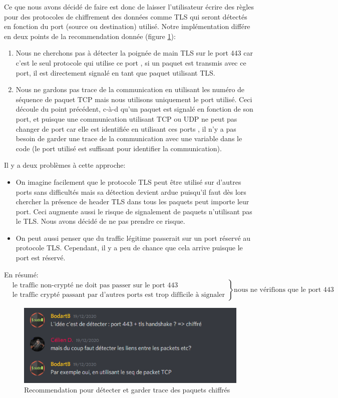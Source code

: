 \documentclass[a4paper]{article}
\begin{document}
Ce que nous avons décidé de faire est donc de laisser l'utilisateur écrire des règles pour des protocoles de chiffrement des données comme TLS qui seront détectés en fonction du port (source ou destination) utilisé. Notre implémentation différe en deux points de la recommendation donnée (figure \ref{fig:tls01}):
\begin{enumerate}
    \item Nous ne cherchons pas à détecter la poignée de main TLS sur le port 443 car c'est le seul protocole qui utilise ce port \cite{5}, si un paquet est transmis avec ce port, il est directement signalé en tant que paquet utilisant TLS.
    \item Nous ne gardons pas trace de la communication en utilisant les numéro de séquence de paquet TCP mais nous utilisons uniquement le port utilisé. Ceci découle du point précédent, c-à-d qu'un paquet est signalé en fonction de son port, et puisque une communication utilisant TCP ou UDP ne peut pas changer de port car elle est identifiée en utilisant ces ports \cite{4}, il n'y a pas besoin de garder une trace de la communication avec une variable dans le code (le port utilisé est suffisant pour identifier la communication).
\end{enumerate}
Il y a deux problèmes à cette approche:
\begin{itemize}
    \item On imagine facilement que le protocole TLS peut être utilisé sur d'autres ports sans difficultés mais sa détection devient ardue puisqu'il faut dès lors chercher la présence de header TLS dans tous les paquets peut importe leur port. Ceci augmente aussi le risque de signalement de paquets n'utilisant pas le TLS. Nous avons décidé de ne pas prendre ce risque.
    \item On peut aussi penser que du traffic légitime passerait sur un port réservé au protocole TLS. Cependant, il y a peu de chance que cela arrive puisque le port est réservé.
\end{itemize}
En résumé:
\[
    \left.\begin{aligned}
        &\text{le traffic non-crypté ne doit pas passer sur le port 443}\\
        &\text{le traffic crypté passant par d'autres ports est trop difficile à signaler}
    \end{aligned}\right\} \text{nous ne vérifions que le port 443}
\]

\begin{figure}[H]
    \centering
    \includegraphics[width=0.75\linewidth]{images/tls-01.PNG}
    \caption{Recommendation pour détecter et garder trace des paquets chiffrés}
    \label{fig:tls01}
\end{figure}
\end{document}
